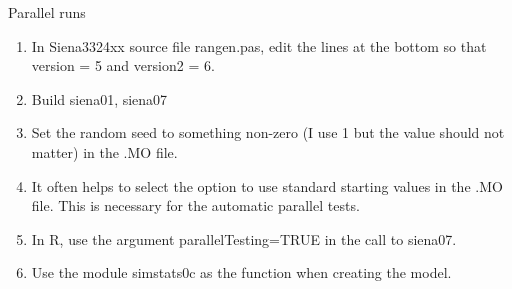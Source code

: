 \documentclass[12pt, a4paper]{article}
\makeatletter
\renewcommand{\=}{\,=\,}
\newcommand{\+}{\,+\,}
\renewcommand{\section}{\@startsection{section}{1}
                {0pt}{\baselineskip}{0.5\baselineskip}
                {\centering\sffamily} }
\makeatother
\begin{document}
\section{Parallel runs}
\begin{enumerate}
\item In Siena3324xx source file \textsf{rangen.pas}, edit the lines at the
  bottom so that \textsf{version = 5} and \textsf{version2 = 6}.
\item Build siena01, siena07
\item Set the random seed to something non-zero (I use 1 but the value
  should not matter) in the .MO file.
\item It often helps to select the option to use standard starting values in the
  .MO file. This is necessary for the automatic parallel tests.
\item In R, use the argument \textsf{parallelTesting=TRUE} in the call to
  \textsf{siena07}.
\item Use the module \textsf{simstats0c} as the function when creating the
  model.
\end{enumerate}
\end{document}
